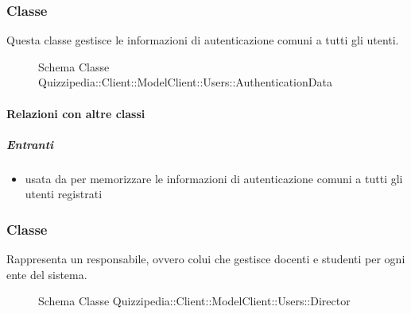 \subsubsection{Classe }
Questa classe gestisce le informazioni di autenticazione comuni a tutti gli utenti.
\begin{figure}[H]
\centering
\noindent{}
\caption[Schema Classe AuthenticationData]{Schema Classe Quizzipedia::Client::ModelClient::Users::AuthenticationData}
\end{figure}
\paragraph{Relazioni con altre classi}
\subparagraph{Entranti}
\begin{itemize}
\item usata da  per memorizzare le informazioni di autenticazione comuni a tutti gli utenti registrati
\end{itemize}
\subsubsection{Classe }
Rappresenta un responsabile, ovvero colui che gestisce docenti e studenti per ogni ente del sistema.
\begin{figure}[H]
\centering
\noindent{}
\caption[Schema Classe Director]{Schema Classe Quizzipedia::Client::ModelClient::Users::Director}
\end{figure}
